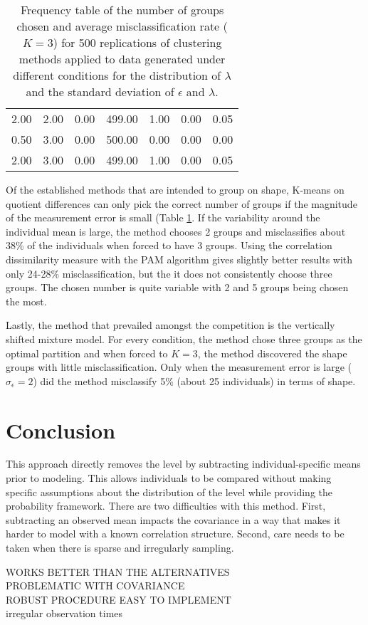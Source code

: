 \documentclass[12pt]{article}
\begin{document}
\begin{table}[ht]
\begin{center}
\begin{tabular}{cc|ccccc}
  2.00 & 2.00 & 0.00 & 499.00 & 1.00 & 0.00 & 0.05 \\ 
  0.50 & 3.00 & 0.00 & 500.00 & 0.00 & 0.00 & 0.00 \\ 
  2.00 & 3.00 & 0.00 & 499.00 & 1.00 & 0.00 & 0.05 \\ 
   \hline\end{tabular}
\caption{Frequency table of the number of groups chosen and average misclassification rate ($K=3$) for 500 replications of clustering methods applied to data generated under different conditions for the distribution of $\lambda$ and the standard deviation of $\epsilon$ and $\lambda$.}
\label{tab:freq1}
\end{center}
\end{table}

Of the established methods that are intended to group on shape, K-means on quotient differences can only pick the correct number of groups if the magnitude of the measurement error is small (Table \ref{tab:freq1}. If the variability around the individual mean is large, the method chooses 2 groups and misclassifies about 38\% of the individuals when forced to have 3 groups. Using the correlation dissimilarity measure with the PAM algorithm gives slightly better results with only 24-28\% misclassification, but the it does not consistently choose three groups. The chosen number is quite variable with 2 and 5 groups being chosen the most.

Lastly, the method that prevailed amongst the competition is the vertically shifted mixture model. For every condition, the method chose three groups as the optimal partition and when forced to $K=3$, the method discovered the shape groups with little misclassification. Only when the measurement error is large ($\sigma_{\epsilon}=2$) did the method misclassify 5\% (about 25 individuals) in terms of shape. 

\section{Conclusion}
This approach directly removes the level by subtracting individual-specific means prior to modeling. This allows individuals to be compared without making specific assumptions about the distribution of the level while providing the probability framework.  There are two difficulties with this method. First, subtracting an observed mean impacts the covariance in a way that makes it harder to model with a known correlation structure. Second, care needs to be taken when there is sparse and irregularly sampling. 

 WORKS BETTER THAN THE ALTERNATIVES\\
 PROBLEMATIC WITH COVARIANCE\\
 ROBUST PROCEDURE EASY TO IMPLEMENT\\
 irregular observation times



\end{document}
